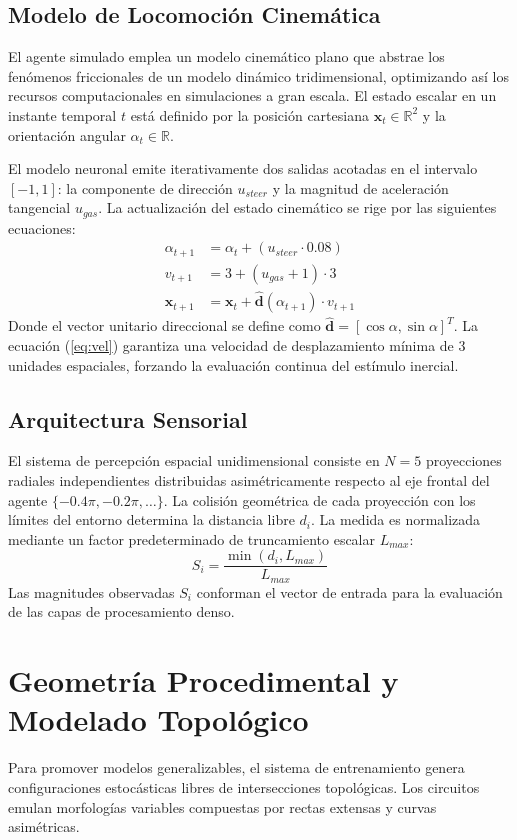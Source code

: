 \documentclass[10pt,twocolumn,letterpaper]{article}
\begin{document}
\subsection{Modelo de Locomoción Cinemática}
El agente simulado emplea un modelo cinemático plano que abstrae los fenómenos friccionales de un modelo dinámico tridimensional, optimizando así los recursos computacionales en simulaciones a gran escala. El estado escalar en un instante temporal $t$ está definido por la posición cartesiana $\mathbf{x}_t \in \mathbb{R}^2$ y la orientación angular $\alpha_t \in \mathbb{R}$.

El modelo neuronal emite iterativamente dos salidas acotadas en el intervalo $[-1, 1]$: la componente de dirección $u_{steer}$ y la magnitud de aceleración tangencial $u_{gas}$. La actualización del estado cinemático se rige por las siguientes ecuaciones:
\begin{align}
\alpha_{t+1} &= \alpha_{t} + (u_{steer} \cdot 0.08) \\
v_{t+1} &= 3 + (u_{gas} + 1) \cdot 3 \label{eq:vel} \\
\mathbf{x}_{t+1} &= \mathbf{x}_t + \mathbf{\hat{d}}(\alpha_{t+1}) \cdot v_{t+1}
\end{align}
Donde el vector unitario direccional se define como $\mathbf{\hat{d}} = \left[ \cos \alpha, \sin \alpha \right]^T$. La ecuación (\ref{eq:vel}) garantiza una velocidad de desplazamiento mínima de $3$ unidades espaciales, forzando la evaluación continua del estímulo inercial.

\subsection{Arquitectura Sensorial}
El sistema de percepción espacial unidimensional consiste en $N=5$ proyecciones radiales independientes distribuidas asimétricamente respecto al eje frontal del agente $\{-0.4\pi, -0.2\pi, \dots\}$. La colisión geométrica de cada proyección con los límites del entorno determina la distancia libre $d_i$. La medida es normalizada mediante un factor predeterminado de truncamiento escalar $L_{max}$:
\begin{equation}
S_i = \frac{\min\left( d_i, L_{max} \right)}{L_{max}}
\end{equation}
Las magnitudes observadas $S_i$ conforman el vector de entrada para la evaluación de las capas de procesamiento denso.

\section{Geometría Procedimental y Modelado Topológico}
Para promover modelos generalizables, el sistema de entrenamiento genera configuraciones estocásticas libres de intersecciones topológicas. Los circuitos emulan morfologías variables compuestas por rectas extensas y curvas asimétricas.
\end{document}
